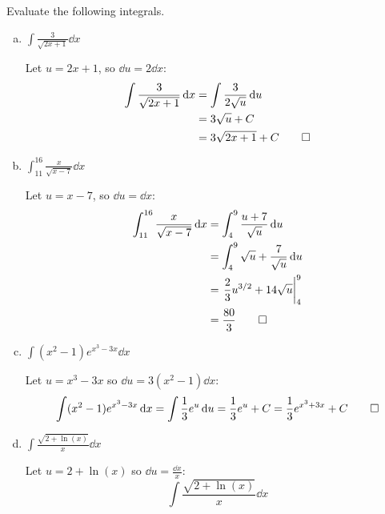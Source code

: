 \documentclass{agony}
\begin{document}
\begin{prob}
  Evaluate the following integrals.
\end{prob}
\begin{enumerate}[(a)]
  \item $\displaystyle\int \frac{3}{\sqrt{2x+1}} \dd{x}$
        \begin{sol}
          Let $u = 2x+1$, so $\dd{u} = 2\dd{x}$:
          \begin{align*}
            \int \frac{3}{\sqrt{2x+1}} \dd{x}
             & = \int \frac{3}{2\sqrt{u}} \dd{u} \\
             & = 3\sqrt{u} + C                   \\
             & = 3\sqrt{2x+1} + C \qedhere
          \end{align*}
        \end{sol}
  \item $\displaystyle\int_{11}^{16} \frac{x}{\sqrt{x-7}} \dd{x}$
        \begin{sol}
          Let $u = x-7$, so $\dd{u} = \dd{x}$:
          \begin{align*}
            \int_{11}^{16} \frac{x}{\sqrt{x-7}} \dd{x}
             & = \int_{4}^{9} \frac{u+7}{\sqrt{u}} \dd{u}          \\
             & = \int_{4}^{9} \sqrt{u} + \frac{7}{\sqrt{u}} \dd{u} \\
             & = \left.\frac{2}{3}u^{3/2} + 14\sqrt{u}\right|_{4}^9         \\
             & = \frac{80}{3} \qedhere
          \end{align*}
        \end{sol}
  \item $\displaystyle\int (x^2-1)e^{x^3-3x} \dd{x}$
        \begin{sol}
          Let $u = x^3 - 3x$ so $\dd{u} = 3(x^2 - 1) \dd{x}$:
          \begin{equation*}
            \int (x^2-1)e^{x^3-3x} \dd{x}
            = \int \frac{1}{3} e^u \dd{u}
            = \frac{1}{3} e^u + C
            = \frac{1}{3} e^{x^3+3x} + C \qedhere
          \end{equation*}
        \end{sol}
  \item $\displaystyle\int \frac{\sqrt{2+\ln(x)}}{x} \dd{x}$
        \begin{sol}
          Let $u = 2+\ln(x)$ so $\dd{u} = \frac{\dd{x}}{x}$:
          \begin{equation*}
            \int \frac{\sqrt{2+\ln(x)}}{x} \dd{x}

\end{equation*}
\end{sol}
\end{enumerate}
\end{document}
